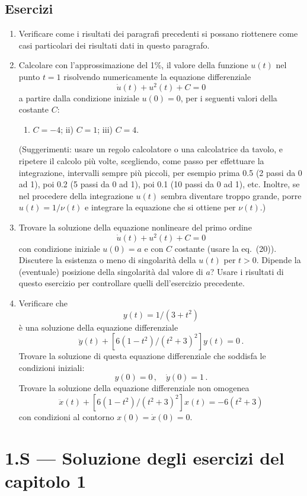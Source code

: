 \documentclass[11pt, a4paper]{book}
\numberwithin{equation}{section}
\newenvironment{esercizi}{\subsection*{Esercizi}\begin{enumerate}}{\end{enumerate}}
\begin{document}
\begin{esercizi}
    \item Verificare come i risultati dei paragrafi precedenti si possano
    riottenere come casi particolari dei risultati dati in questo paragrafo.
    \item Calcolare con l'approssimazione del 1\%, il valore della funzione
    $u(t)$ nel punto $t=1$ risolvendo numericamente la equazione differenziale
    \[
        \dot{u}(t) + u^2(t) + C = 0
    \]
    a partire dalla condizione iniziale $u(0) = 0$, per i seguenti valori
    della costante $C$:
    \begin{enumerate}
        \item $C = -4$; \quad ii) $C = 1$; \quad iii) $C = 4$.
    \end{enumerate}
    (Suggerimenti: usare un regolo calcolatore o una calcolatrice da tavolo,
    e ripetere il calcolo più volte, scegliendo, come passo per effettuare la
    integrazione, intervalli sempre più piccoli, per esempio prima 0.5 (2 passi
    da 0 ad 1), poi 0.2 (5 passi da 0 ad 1), poi 0.1 (10 passi da 0 ad 1),
    etc. Inoltre, se nel procedere della integrazione $u(t)$ sembra diventare
    troppo grande, porre $u(t) = 1/\nu(t)$ e integrare la equazione che si
    ottiene per $\nu(t)$.)
    \item Trovare la soluzione della equazione nonlineare del primo ordine
    \[
        \dot{u}(t) + u^2(t) + C = 0
    \]
    con condizione iniziale $u(0) = a$ e con $C$ costante (usare la eq.~(20)).
    Discutere la esistenza o meno di singolarità della $u(t)$ per $t > 0$.
    Dipende la (eventuale) posizione della singolarità dal valore di $a$? Usare
    i risultati di questo esercizio per controllare quelli dell'esercizio
    precedente.
    \item Verificare che
    \[
        y(t) = 1/(3 + t^2)
    \]
    è una soluzione della equazione differenziale
    \[
        \ddot{y}(t) + \left[ 6(1-t^2)/(t^2+3)^2 \right] y(t) = 0 \,.
    \]
    Trovare la soluzione di questa equazione differenziale che soddisfa le
    condizioni iniziali:
    \[
        y(0) = 0 \,, \quad \dot{y}(0) = 1 \,.
    \]
    Trovare la soluzione della equazione differenziale non omogenea
    \[
        \ddot{x}(t) + \left[ 6(1-t^2)/(t^2+3)^2 \right] x(t) = -6(t^2+3)
    \]
    con condizioni al contorno $x(0) = \dot{x}(0) = 0$.
\end{esercizi}

\section*{1.S --- Soluzione degli esercizi del capitolo 1}
\end{document}
